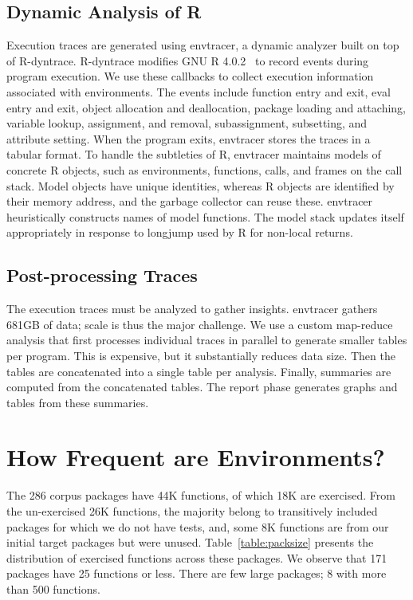 \documentclass[10pt,sigplan,authorversion=true]{acmart}
\newcommand{\envtracer}{{\sf envtracer}\xspace}
\newcommand{\rdyntrace}{{\sf R-dyntrace}\xspace}
\begin{document}
\subsection{Dynamic Analysis of R}

Execution traces are generated using \envtracer, a dynamic analyzer built on top
of \rdyntrace. \rdyntrace modifies GNU R 4.0.2~\cite{oopsla19b} to record events
during program execution. We use these callbacks to collect execution
information associated with environments. The events include function entry and
exit, eval entry and exit, object allocation and deallocation, package loading
and attaching, variable lookup, assignment, and removal, subassignment,
subsetting, and attribute setting. When the program exits, \envtracer stores the
traces in a tabular format. To handle the subtleties of R, \envtracer maintains
models of concrete R objects, such as environments, functions, calls, and frames
on the call stack. Model objects have unique identities, whereas R objects are
identified by their memory address, and the garbage collector can reuse these.
\envtracer heuristically constructs names of model functions. The model stack
updates itself appropriately in response to longjump used by R for non-local
returns.

\subsection{Post-processing Traces}

The execution traces must be analyzed to gather insights. \envtracer gathers
681GB of data; scale is thus the major challenge. We use a custom map-reduce
analysis that first processes individual traces in parallel to generate smaller
tables per program. This is expensive, but it substantially reduces data size.
Then the tables are concatenated into a single table per analysis. Finally,
summaries are computed from the concatenated tables. The report phase generates
graphs and tables from these summaries.

\section{How Frequent are Environments?}

The 286 corpus packages have 44K functions, of which 18K are exercised. From the
un-exercised 26K functions, the majority belong to transitively included
packages for which we do not have tests, and, some 8K functions are from our
initial target packages but were unused. Table~\ref{table:packsize} presents the
distribution of exercised functions across these packages. We observe that 171
packages have 25 functions or less. There are few large packages; 8 with more
than 500 functions.
\end{document}
